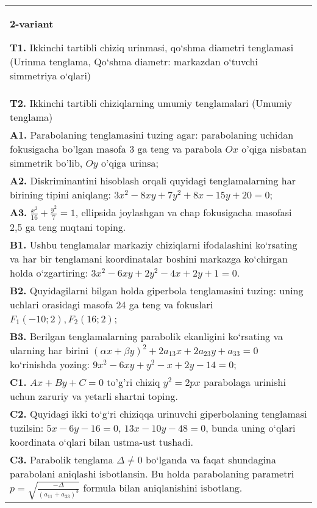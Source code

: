 \documentclass{article}
\begin{document}
\begin{tabular}{m{17cm}}
\textbf{2-variant}
\newline

\textbf{T1.} Ikkinchi tartibli chiziq urinmasi, qo‘shma diametri tenglamasi (Urinma tenglama, Qo‘shma diametr: markazdan o‘tuvchi simmetriya o‘qlari) \\
\textbf{T2.} Ikkinchi tartibli chiziqlarning umumiy tenglamalari (Umumiy tenglama) \\
\textbf{A1.} Parabolaning tenglamasini tuzing agar: parabolaning uchidan fokusigacha bo'lgan masofa 3 ga teng va parabola $O x$ o'qiga nisbatan simmetrik bo'lib, $O y$ o'qiga urinsa; \\
\textbf{A2.} Diskriminantini hisoblash orqali quyidagi tenglamalarning har birining tipini aniqlang: $3 x^2-8 x y+7 y^2+8 x-15 y+20=0$; \\
\textbf{A3.} $\frac{x^2}{16}+\frac{y^2}{7}=1$, ellipsida joylashgan va chap fokusigacha masofasi 2,5 ga teng nuqtani toping. \\
\textbf{B1.} Ushbu tenglamalar markaziy chiziqlarni ifodalashini ko‘rsating va har bir tenglamani koordinatalar boshini markazga ko‘chirgan holda o‘zgartiring: $3x^2-6xy+2y^2-4x+2y+1=0$. \\
\textbf{B2.} Quyidagilarni bilgan holda giperbola tenglamasini tuzing: uning uchlari orasidagi masofa 24 ga teng va fokuslari $F_1 (-10; 2), F_2 (16; 2) $; \\
\textbf{B3.} Berilgan tenglamalarning parabolik ekanligini ko‘rsating va ularning har birini $(\alpha x+\beta y)^2+2 a_{13} x+2 a_{23} y+a_{33}=0$ ko‘rinishda yozing: $9 x^2-6 x y+y^2-x+2 y-14=0$; \\
\textbf{C1.} $A x+B y+C=0$ to'g'ri chiziq $y^2=2 p x$ parabolaga urinishi uchun zaruriy va yetarli shartni toping. \\
\textbf{C2.} Quyidagi ikki to‘g‘ri chiziqqa urinuvchi giperbolaning tenglamasi tuzilsin: $5x-6y-16=0$, $13x-10y-48=0$, bunda uning o‘qlari koordinata o‘qlari bilan ustma-ust tushadi. \\
\textbf{C3.} Parabolik tenglama $\Delta \neq 0$ bo‘lganda va faqat shundagina parabolani aniqlashi isbotlansin. Bu holda parabolaning parametri $p=\sqrt{\frac{-\Delta}{ (a_{11}+a_{33}) ^3}}$ formula bilan aniqlanishini isbotlang. \\

\end{tabular}
\vspace{1cm}
\end{document}
